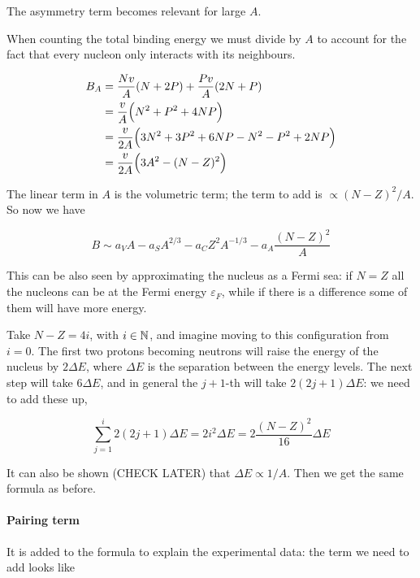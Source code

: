 \documentclass{article}
\begin{document}
The asymmetry term becomes relevant for large \(A\).

When counting the total binding energy we must divide by \(A\) to account for the fact that every nucleon only interacts with its neighbours.

\begin{subequations}
\begin{align}
    B _A
    &= \frac{N v}{A} \qty(N + 2 P)  + \frac{P v}{A} \qty(2N + P) \\
    &= \frac{v}{A} \qty(N^2 + P^2 + 4 NP)  \\
    &= \frac{v}{2A} \qty(3N^2 + 3P^2 + 6NP - N^2 - P^2 + 2NP) \\
    &= \frac{v}{2A} \qty(3A^2 - (N-Z)^2)
\end{align}
\end{subequations}

The linear term in \(A\) is the volumetric term; the term to add is \(\propto (N-Z)^2 / A\). So now we have

\begin{equation}
    B \sim a_V A - a_S A ^{2/3} - a_C Z^2 A ^{-1/3} - a_A \frac{(N-Z)^2}{A}
\end{equation}

This can be also seen by approximating the nucleus as a Fermi sea: if \(N=Z\) all the nucleons can be at the Fermi energy \(\varepsilon_F\), while if there is a difference some of them will have more energy.

Take \(N-Z = 4i\), with \(i \in \mathbb{N}\), and imagine moving to this configuration from \(i=0\). The first two protons becoming neutrons will raise the energy of the nucleus by \(2 \Delta E\), where \(\Delta E\) is the separation between the energy levels. The next step will take \(6 \Delta E\), and in general  the \(j+1\)-th will take \(2 (2j+1) \Delta E\): we need to add these up,

\begin{equation}
    \sum _{j=1} ^{i} 2 (2j+1) \Delta E =   2 i^2 \Delta E = 2\frac{(N-Z)^2}{16} \Delta E
\end{equation}

It can also be shown (CHECK LATER) that \(\Delta E \propto 1/A\). Then we get the same formula as before.

\paragraph{Pairing term}

It is added to the formula to explain the experimental data: the term we need to add looks like
\end{document}
